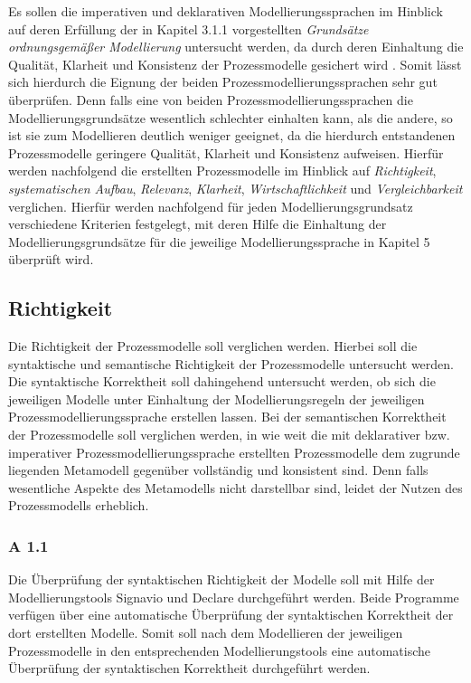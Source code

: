 Es sollen die imperativen und deklarativen Modellierungssprachen im Hinblick auf deren Erfüllung der in Kapitel 3.1.1 vorgestellten \textit{Grundsätze ordnungsgemäßer Modellierung} untersucht werden, da durch deren Einhaltung die Qualität, Klarheit und Konsistenz der Prozessmodelle gesichert wird \cite{freund2007}. Somit lässt sich hierdurch die Eignung der beiden Prozessmodellierungssprachen sehr gut überprüfen. Denn falls eine von beiden Prozessmodellierungssprachen die Modellierungsgrundsätze wesentlich schlechter einhalten kann, als die andere, so ist sie zum Modellieren deutlich weniger geeignet, da die hierdurch entstandenen Prozessmodelle geringere Qualität, Klarheit und Konsistenz aufweisen. Hierfür werden nachfolgend die erstellten Prozessmodelle im Hinblick auf \textit{Richtigkeit}, \textit{systematischen Aufbau}, \textit{Relevanz}, \textit{Klarheit}, \textit{Wirtschaftlichkeit} und \textit{Vergleichbarkeit} verglichen. Hierfür werden nachfolgend für jeden Modellierungsgrundsatz verschiedene Kriterien festgelegt, mit deren Hilfe die Einhaltung der Modellierungsgrundsätze für die jeweilige Modellierungssprache in Kapitel 5 überprüft wird. \newline

\subsection{Richtigkeit}
Die Richtigkeit der Prozessmodelle soll verglichen werden. Hierbei soll die syntaktische und semantische Richtigkeit der Prozessmodelle untersucht werden. Die syntaktische Korrektheit soll dahingehend untersucht werden, ob sich die jeweiligen Modelle unter Einhaltung der Modellierungsregeln der jeweiligen Prozessmodellierungssprache erstellen lassen. Bei der semantischen Korrektheit der Prozessmodelle soll verglichen werden, in wie weit die mit deklarativer bzw. imperativer Prozessmodellierungssprache erstellten Prozessmodelle dem zugrunde liegenden Metamodell gegenüber vollständig und konsistent sind. Denn falls wesentliche Aspekte des Metamodells nicht darstellbar sind, leidet der Nutzen des Prozessmodells erheblich.  \newline


\subsubsection{A 1.1}

Die Überprüfung der syntaktischen Richtigkeit der Modelle soll mit Hilfe der Modellierungstools Signavio und Declare durchgeführt werden. Beide Programme verfügen über eine automatische Überprüfung der syntaktischen Korrektheit der dort erstellten Modelle. Somit soll nach dem Modellieren der jeweiligen Prozessmodelle in den entsprechenden Modellierungstools eine automatische Überprüfung der syntaktischen Korrektheit durchgeführt werden. \newline


